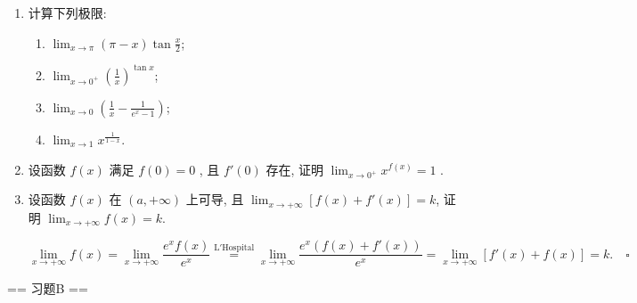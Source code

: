 \begin{enumerate}
\begin{enumerate}
    \end{enumerate}
    \item[4.]计算下列极限:
    \begin{enumerate}
        \item[(a)]$\displaystyle \lim_{x\to \pi}(\pi -x)\tan {\frac{x}{2}}$;
        \item[(b)]$\displaystyle \lim_{x\to 0^{+}}\left(\frac{1}{x}\right)^{\tan x}$;
        \item[(c)]$\displaystyle \lim_{x\to 0}\left(\frac{1}{x} -\frac{1}{e^{x} - 1}\right)$;
        \item[(d)]$\displaystyle \lim_{x\to 1}x^{\frac{1}{1 - x}}$.
    \end{enumerate}
    \item[5.]设函数 \(f(x)\) 满足 \(f(0) = 0\) , 且 \(f'(0)\) 存在, 证明 \(\displaystyle \lim_{x \to 0^+} x^{f(x)} = 1\) .
    \item[6.]设函数 \(f(x)\) 在 \(\displaystyle(a, +\infty)\) 上可导, 且 \(\displaystyle\lim_{x \to +\infty} [f(x) + f'(x)] = k\), 
    证明 \(\displaystyle\lim_{x \to +\infty} f(x) = k\).
    \begin{solution}
        \[
        \lim_{x\to +\infty}f(x)=\lim_{x\to +\infty}\frac{e^xf(x)}{e^x}\overset{\mathrm{L'Hospital}}{=}\lim_{x\to +\infty}\frac{e^x(f(x)+f'(x))}{e^x}=\lim_{x\to +\infty}[f'(x)+f(x)]=k. \quad \square
        \]
    \end{solution}
\end{enumerate}

== 习题B ==

